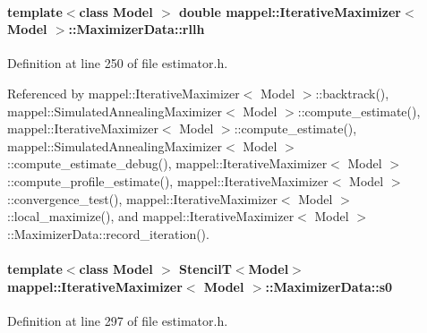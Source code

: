 \paragraph[{\texorpdfstring{rllh}{rllh}}]{\setlength{\rightskip}{0pt plus 5cm}template$<$class Model $>$ double {\bf mappel\+::\+Iterative\+Maximizer}$<$ Model $>$\+::Maximizer\+Data\+::rllh}\hypertarget{classmappel_1_1IterativeMaximizer_1_1MaximizerData_a224b29201511a2ab8ca86535631c41ef}{}\label{classmappel_1_1IterativeMaximizer_1_1MaximizerData_a224b29201511a2ab8ca86535631c41ef}


Definition at line 250 of file estimator.\+h.



Referenced by mappel\+::\+Iterative\+Maximizer$<$ Model $>$\+::backtrack(), mappel\+::\+Simulated\+Annealing\+Maximizer$<$ Model $>$\+::compute\+\_\+estimate(), mappel\+::\+Iterative\+Maximizer$<$ Model $>$\+::compute\+\_\+estimate(), mappel\+::\+Simulated\+Annealing\+Maximizer$<$ Model $>$\+::compute\+\_\+estimate\+\_\+debug(), mappel\+::\+Iterative\+Maximizer$<$ Model $>$\+::compute\+\_\+profile\+\_\+estimate(), mappel\+::\+Iterative\+Maximizer$<$ Model $>$\+::convergence\+\_\+test(), mappel\+::\+Iterative\+Maximizer$<$ Model $>$\+::local\+\_\+maximize(), and mappel\+::\+Iterative\+Maximizer$<$ Model $>$\+::\+Maximizer\+Data\+::record\+\_\+iteration().

\paragraph[{\texorpdfstring{s0}{s0}}]{\setlength{\rightskip}{0pt plus 5cm}template$<$class Model $>$ {\bf StencilT}$<$Model$>$ {\bf mappel\+::\+Iterative\+Maximizer}$<$ Model $>$\+::Maximizer\+Data\+::s0\hspace{0.3cm}{\ttfamily [protected]}}\hypertarget{classmappel_1_1IterativeMaximizer_1_1MaximizerData_a1a3b8f9693e769eded9fe76751fa49c1}{}\label{classmappel_1_1IterativeMaximizer_1_1MaximizerData_a1a3b8f9693e769eded9fe76751fa49c1}


Definition at line 297 of file estimator.\+h.

